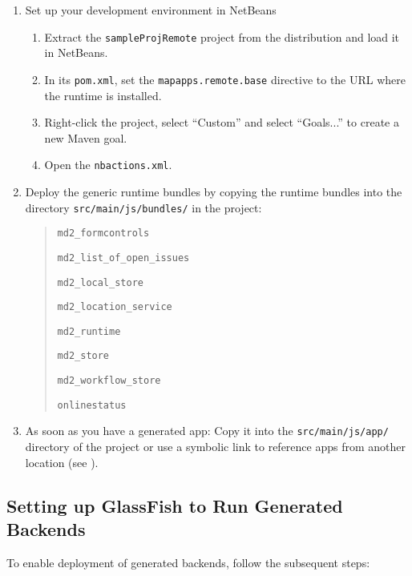 \begin{enumerate}
\item {Set up your \mapapps  development environment in NetBeans}

\begin{enumerate}
\item Extract the \lstinline|sampleProjRemote| project from the \mapapps distribution and load it in NetBeans. \label{item:extraction}
\item In its \lstinline|pom.xml|,
 set the \lstinline|mapapps.remote.base| directive to the URL where the \mapapps runtime is installed.
\item Right-click the project, select \enquote{Custom} and select \enquote{Goals...} to create a new Maven goal. 
\item Open the \lstinline|nbactions.xml|. 

\end{enumerate}

\item Deploy the generic \MD runtime bundles by copying the \MD runtime bundles into the directory \lstinline[language=Simple]|src/main/js/bundles/| in the project:
	\begin{quotation}
		 \lstinline|md2_formcontrols|
		 
		 \lstinline|md2_list_of_open_issues|
		 
		 \lstinline|md2_local_store|
		 
		 \lstinline|md2_location_service|
		 
		 \lstinline|md2_runtime|
		 		 
		 \lstinline|md2_store|
		 
		 \lstinline|md2_workflow_store|
		 
		 \lstinline|onlinestatus|
	\end{quotation}

\item As soon as you have a generated \mapapps app: Copy it into the \lstinline[language=Simple]|src/main/js/app/| directory of the project or use a symbolic link to reference apps from another location (see ).


\end{enumerate}

\subsection{Setting up GlassFish to Run Generated Backends}
To enable deployment of generated backends, follow the subsequent steps:

